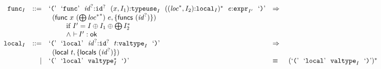 $$
\begin{array}[t]{@{}lrrl@{}l@{}l@{}l@{}}
& {{\mathtt{func}}}_{I} & ::= & \mbox{‘\texttt{{(}}’}~~\mbox{‘\texttt{func}’}~~{{\mathit{id}}^?}{:}{{\mathtt{id}}^?}~~(x, I_1){:}{{\mathtt{typeuse}}}_{I}~~{(({{\mathit{loc}}^\ast}, I_2){:}{{\mathtt{local}}}_{I})^\ast}~~e{:}{{\mathtt{expr}}}_{{I'}}~~\mbox{‘\texttt{{)}}’} & \quad\Rightarrow\quad{} & & \\
&&& \multicolumn{4}{@{}l@{}}{\quad
\begin{array}[t]{@{}l@{}l@{}l@{}}
(\mathsf{func}~x~({\bigoplus}\, {{{\mathit{loc}}^\ast}^\ast})~e, \{ \mathsf{funcs}~({{\mathit{id}}^?}) \}) & & \\
 \multicolumn{3}{@{}l@{}}{\quad
\begin{array}[t]{@{}l@{}}
\quad
\begin{array}[t]{@{}l@{}}
\mbox{if}~ {I'} = I \oplus I_1 \oplus {\bigoplus}\, {I_2^\ast} \\
{\land}~ {\vdash}\, {I'} : \mathsf{ok} \\
\end{array} \\
\end{array}
} \\
\end{array}
} \\
& {{\mathtt{local}}}_{I} & ::= & \mbox{‘\texttt{{(}}’}~~\mbox{‘\texttt{local}’}~~{{\mathit{id}}^?}{:}{{\mathtt{id}}^?}~~t{:}{{\mathtt{valtype}}}_{I}~~\mbox{‘\texttt{{)}}’} & \quad\Rightarrow\quad{} & & \\
&&& \multicolumn{4}{@{}l@{}}{\quad
\begin{array}[t]{@{}l@{}}
(\mathsf{local}~t, \{ \mathsf{locals}~({{\mathit{id}}^?}) \}) \\
\end{array}
} \\
& & | & \mbox{‘\texttt{{(}}’}~~\mbox{‘\texttt{local}’}~~{{{\mathtt{valtype}}}_{I}^\ast}~~\mbox{‘\texttt{{)}}’} & \quad\equiv\quad{} & {(\mbox{‘\texttt{{(}}’}~~\mbox{‘\texttt{local}’}~~{{\mathtt{valtype}}}_{I}~~\mbox{‘\texttt{{)}}’})^\ast} \\
\end{array}
$$

\vspace{1ex}

